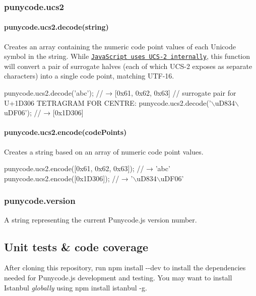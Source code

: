 \subsubsection*{{\ttfamily punycode.\+ucs2}}

\paragraph*{{\ttfamily punycode.\+ucs2.\+decode(string)}}

Creates an array containing the numeric code point values of each Unicode symbol in the string. While \href{https://mathiasbynens.be/notes/javascript-encoding}{\tt Java\+Script uses U\+C\+S-\/2 internally}, this function will convert a pair of surrogate halves (each of which U\+C\+S-\/2 exposes as separate characters) into a single code point, matching U\+T\+F-\/16.


\begin{DoxyCode}
punycode.ucs2.decode('abc');
// → [0x61, 0x62, 0x63]
// surrogate pair for U+1D306 TETRAGRAM FOR CENTRE:
punycode.ucs2.decode('\(\backslash\)uD834\(\backslash\)uDF06');
// → [0x1D306]
\end{DoxyCode}


\paragraph*{{\ttfamily punycode.\+ucs2.\+encode(code\+Points)}}

Creates a string based on an array of numeric code point values.


\begin{DoxyCode}
punycode.ucs2.encode([0x61, 0x62, 0x63]);
// → 'abc'
punycode.ucs2.encode([0x1D306]);
// → '\(\backslash\)uD834\(\backslash\)uDF06'
\end{DoxyCode}


\subsubsection*{{\ttfamily punycode.\+version}}

A string representing the current Punycode.\+js version number.

\subsection*{Unit tests \& code coverage}

After cloning this repository, run {\ttfamily npm install -\/-\/dev} to install the dependencies needed for Punycode.\+js development and testing. You may want to install Istanbul {\itshape globally} using {\ttfamily npm install istanbul -\/g}.

